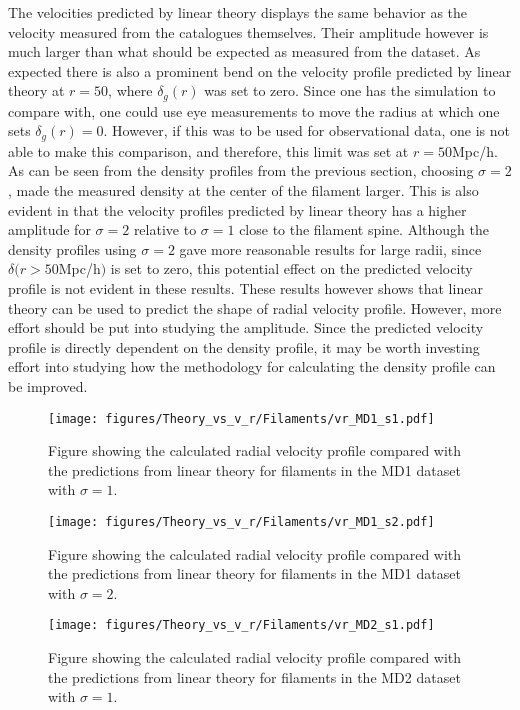 The velocities predicted by linear theory displays the same behavior as the velocity measured from the catalogues themselves. Their amplitude however is much larger than what should be expected as measured from the dataset. As expected there is also a prominent bend on the velocity profile predicted by linear theory at $r=50$, where $\delta_g(r)$ was set to zero. Since one has the simulation to compare with, one could use eye measurements to move the radius at which one sets $\delta_g(r)=0$. However, if this was to be used for observational data, one is not able to make this comparison, and therefore, this limit was set at $r=50$Mpc/h. As can be seen from the density profiles from the previous section, choosing $\sigma=2$, made the measured density at the center of the filament larger. This is also evident in that the velocity profiles predicted by linear theory has a higher amplitude for $\sigma=2$ relative to $\sigma=1$ close to the filament spine. Although the density profiles using $\sigma=2$ gave more reasonable results for large radii, since $\delta(r>50$Mpc/h$)$ is set to zero, this potential effect on the predicted velocity profile is not evident in these results. These results however shows that linear theory can be used to predict the shape of radial velocity profile. However, more effort should be put into studying the amplitude. Since the predicted velocity profile is directly dependent on the density profile, it may be worth investing effort into studying how the methodology for calculating the density profile can be improved. 


\begin{figure}[H]
    \texttt{[image: figures/Theory\_vs\_v\_r/Filaments/vr\_MD1\_s1.pdf]}
    \caption{Figure showing the calculated radial velocity profile compared with the predictions from linear theory for filaments in the MD1 dataset with $\sigma=1$.}
    \label{fig:filvrMD1s1}
\end{figure}

\begin{figure}[H]
    \texttt{[image: figures/Theory\_vs\_v\_r/Filaments/vr\_MD1\_s2.pdf]}
    \caption{Figure showing the calculated radial velocity profile compared with the predictions from linear theory for filaments in the MD1 dataset with $\sigma=2$.}
    \label{fig:filvrMD1s2}
\end{figure}

\begin{figure}[H]
    \texttt{[image: figures/Theory\_vs\_v\_r/Filaments/vr\_MD2\_s1.pdf]}
    \caption{Figure showing the calculated radial velocity profile compared with the predictions from linear theory for filaments in the MD2 dataset with $\sigma=1$.}
    \label{fig:filvrMD2s1}
\end{figure}

